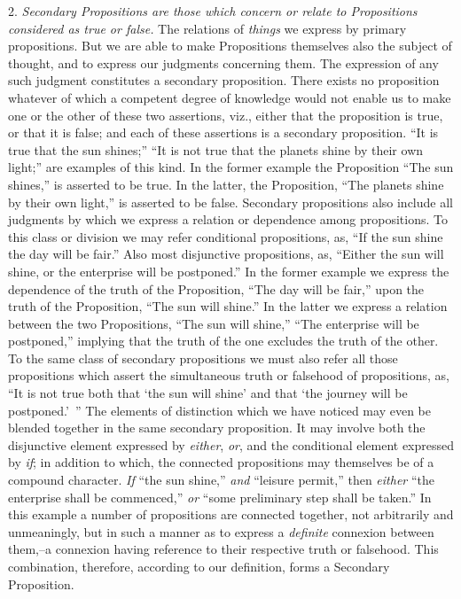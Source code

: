 \documentclass[oneside]{book}
\begin{document}
2. \textit{Secondary Propositions are those which concern or relate to
Propositions considered as true or false.} The relations of \textit{things}
we express by primary propositions. But we are able to make
Propositions themselves also the subject of thought, and to express
our judgments concerning them. The expression of any
such judgment constitutes a secondary proposition. There exists
no proposition whatever of which a competent degree of knowledge
would not enable us to make one or the other of these two
assertions, viz., either that the proposition is true, or that it is
false; and each of these assertions is a secondary proposition. ``It
is true that the sun shines;'' ``It is not true that the planets
shine by their own light;'' are examples of this kind. In the
former example the Proposition ``The sun shines,'' is asserted to
be true. In the latter, the Proposition, ``The planets shine by
their own light,'' is asserted to be false. Secondary propositions
also include all judgments by which we express a relation or dependence
among propositions. To this class or division we may
refer conditional propositions, as, ``If the sun shine the day will
be fair.'' Also most disjunctive propositions, as, ``Either the sun
will shine, or the enterprise will be postponed.'' In the former
example we express the dependence of the truth of the Proposition,
``The day will be fair,'' upon the truth of the Proposition,
``The sun will shine.'' In the latter we express a relation between
the two Propositions, ``The sun will shine,'' ``The enterprise will
be postponed,'' implying that the truth of the one excludes the
truth of the other. To the same class of secondary propositions we
must also refer all those propositions which assert the simultaneous
truth or falsehood of propositions, as, ``It is not true both that
`the sun will shine' and that `the journey will be postponed.'~''
The elements of distinction which we have noticed may even be
blended together in the same secondary proposition. It may involve
both the disjunctive element expressed by \textit{either}, \textit{or}, and
the conditional element expressed by \textit{if}; in addition to which,
the connected propositions may themselves be of a compound
character. \textit{If} ``the sun shine,'' \textit{and} ``leisure permit,'' then \textit{either}
``the enterprise shall be commenced,'' \textit{or} ``some preliminary
step shall be taken.'' In this example a number of propositions
are connected together, not arbitrarily and unmeaningly, but in
such a manner as to express a \textit{definite} connexion between them,--a
connexion having reference to their respective truth or falsehood.
This combination, therefore, according to our definition, forms
a Secondary Proposition.
\end{document}
